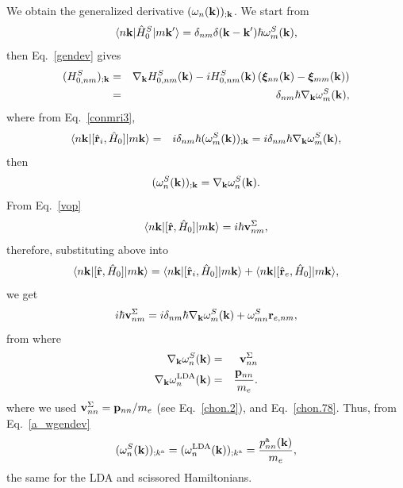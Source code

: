 \documentclass[floatfix,prb,aps,superscriptaddress,11pt,preprint]{revtex4}
\begin{document}
We obtain the
generalized derivative $(\omega_n(\mathbf{k}))_{;\mathbf{k}}$.
We start from
\begin{equation}\label{a_conH0}
\langle n\mathbf{k} |\hat{H}^S_0| m\mathbf{k}' \rangle=\delta_{nm}\delta(\mathbf{k}-\mathbf{k}')\hbar\omega^S_m(\mathbf{k})
,
\end{equation}
then Eq.~\eqref{gendev} gives
\begin{eqnarray}\label{a_genderH0}
(H^S_{0,nm})_{;\mathbf{k}}&=&
\nabla_{\mathbf{k}}
H^S_{0,n m}(\mathbf{k})
-
i
H^S_{0,nm}(\mathbf{k})
\left(
\boldsymbol{\xi}_{nn}(\mathbf{k})
-
\boldsymbol{\xi}_{mm}(\mathbf{k})
\right)
\nonumber\\
&=&\delta_{nm}\hbar\nabla_{\mathbf{k}}\omega^S_m(\mathbf{k})
,
\end{eqnarray}
where from Eq.~\eqref{conmri3}, 
\begin{eqnarray}\label{a_rih0}
\langle n\mathbf{k} |[\hat{\mathbf{r}}_i,\hat{H}_0]| m\mathbf{k} \rangle&=&
i\delta_{nm}\hbar(\omega^S_m(\mathbf{k}))_{;\mathbf{k}}
=
i\delta_{nm}\hbar\nabla_{\mathbf{k}}\omega^S_m(\mathbf{k})
,
\end{eqnarray}
then
\begin{equation}\label{a_wgendev}
(\omega^S_n(\mathbf{k}))_{;\mathbf{k}}=
\nabla_{\mathbf{k}}\omega^S_n(\mathbf{k})
.
\end{equation}
From Eq.~\eqref{vop} 
\begin{equation}\label{a_hr}
\langle n\mathbf{k} |[\hat{\mathbf{r}},\hat{H}_0]| m\mathbf{k} \rangle=
i\hbar\mathbf{v}^\Sigma_{nm}
,
\end{equation}
therefore, substituting above into
\begin{equation}\label{a_hrt}
\langle n\mathbf{k} |[\hat{\mathbf{r}},\hat{H}_0]| m\mathbf{k} \rangle=
\langle n\mathbf{k} |[\hat{\mathbf{r}}_i,\hat{H}_0]| m\mathbf{k} \rangle
+
\langle n\mathbf{k} |[\hat{\mathbf{r}}_e,\hat{H}_0]| m\mathbf{k} \rangle
,
\end{equation}
we get
\begin{equation}\label{a_hrt2}
i\hbar\mathbf{v}^\Sigma_{nm}=
i\delta_{nm}\hbar\nabla_{\mathbf{k}}\omega^S_m(\mathbf{k})
+
\omega^S_{mn}\mathbf{r}_{e,nm}
,
\end{equation}
from where
\begin{eqnarray}\label{a_gradw}
\nabla_{\mathbf{k}}\omega^S_n(\mathbf{k})
&=&
\mathbf{v}^\Sigma_{nn}
\nonumber\\
\nabla_{\mathbf{k}}\omega^{\mathrm{LDA}}_n(\mathbf{k})
&=&
\frac{\mathbf{p}_{nn}}{m_e}
.
\end{eqnarray}
where we used $\mathbf{v}^\Sigma_{nn}=\mathbf{p}_{nn}/m_e$ (see Eq.~\eqref{chon.2}), and Eq.~\eqref{chon.78}.
Thus,  from Eq.~\eqref{a_wgendev}
\begin{equation}\label{a_gradw2}
(\omega^S_n(\mathbf{k}))_{;k^{\mathrm{a}}}=
(\omega^{\mathrm{LDA}}_n(\mathbf{k}))_{;k^{\mathrm{a}}}=
\frac{p^{\mathrm{a}}_{nn}(\mathbf{k})}{m_e}
,
\end{equation}
the same for the LDA and scissored Hamiltonians.
\end{document}
